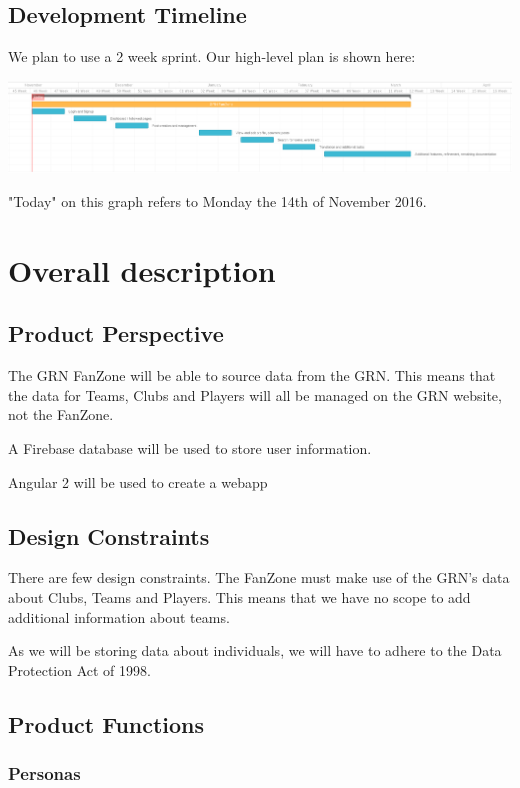 \documentclass[10pt,a4paper]{article}
\begin{document}
\newpage

\subsection{Development Timeline}

We plan to use a 2 week sprint. Our high-level plan is shown here:

\includegraphics[width=\textwidth]{ganttchart}

"Today" on this graph refers to Monday the 14th of November 2016.


\newpage
\section{Overall description}

\subsection{Product Perspective}
The GRN FanZone will be able to source data from the GRN. This means that the data for Teams, Clubs and Players will all be managed on the GRN website, not the FanZone. 


A Firebase database will be used to store user information.


Angular 2 will be used to create a webapp

\subsection{Design Constraints}

There are few design constraints. The FanZone must make use of the GRN's data about Clubs, Teams and Players. This means that we have no scope to add additional information about teams. 

As we will be storing data about individuals, we will have to adhere to the Data Protection Act of 1998.


\subsection{Product Functions}

\subsubsection{Personas}
\end{document}
